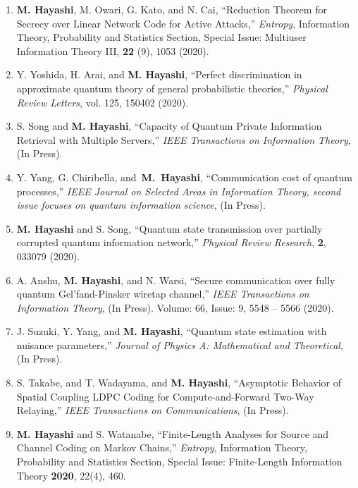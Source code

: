 \documentclass[a4paper,12pt,oneside]{article}
\begin{document}
\begin{enumerate}
\item 
\textbf{M. Hayashi}, M. Owari, G. Kato, and N. Cai,
``Reduction Theorem for Secrecy over Linear Network
Code for Active Attacks,''
{\em Entropy}, Information Theory, Probability and Statistics Section, Special Issue: Multiuser Information Theory III,  
{\bf 22} (9), 1053 (2020).

\item 
Y. Yoshida, H. Arai, and \textbf{M. Hayashi},
``Perfect discrimination in approximate quantum theory of general probabilistic theories,''
{\em Physical Review Letters}, 
vol. 125, 150402 (2020).

\item 
S. Song and \textbf{M. Hayashi},
``Capacity of Quantum Private Information Retrieval with Multiple Servers,''
{\em IEEE Transactions on Information Theory}, (In Press).

\item
Y. Yang, G. Chiribella,  and~\textbf{M.~Hayashi},
``Communication cost of quantum processes,''
{\em IEEE Journal on Selected Areas in Information Theory, second issue focuses on quantum information science},
(In Press).
 
\item
\textbf{M. Hayashi} and S. Song,
``Quantum state transmission over partially corrupted quantum information network,''
{\em Physical Review Research},  {\bf 2}, 033079 (2020).

\item
A. Anshu, \textbf{M. Hayashi}, and N. Warsi,   
``Secure communication over fully quantum Gel'fand-Pinsker wiretap channel,''
{\em IEEE Transactions on Information Theory}, (In Press).
Volume: 66, Issue: 9, 5548 -- 5566 (2020). 

\item
J. Suzuki, Y. Yang, and \textbf{M. Hayashi},
``Quantum state estimation with nuisance parameters,'' 
{\em Journal of Physics A: Mathematical and Theoretical}, 
(In Press).

\item
S. Takabe, and T. Wadayama, and \textbf{M. Hayashi}, 
``Asymptotic Behavior of Spatial Coupling LDPC Coding for Compute-and-Forward Two-Way Relaying,''
{\em IEEE Transactions on Communications},
(In Press).

\item
\textbf{M. Hayashi} and S. Watanabe,
``Finite-Length Analyses for Source and Channel Coding on Markov Chains,'' 
{\em Entropy}, Information Theory, Probability and Statistics Section, Special Issue: Finite-Length Information Theory  
{\bf 2020}, 22(4), 460.


\end{enumerate}
\end{document}
